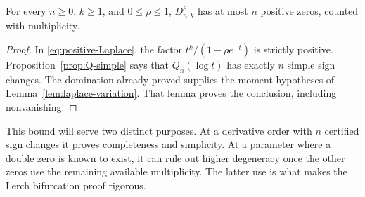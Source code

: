\begin{theorem}
\label{thm:global-zero-bound}
For every $n\ge0$, $k\ge1$, and $0\le\rho\le1$,
$D_{n,k}^{\rho}$ has at most $n$ positive zeros, counted with multiplicity.
\end{theorem}
\begin{proof}
In \eqref{eq:positive-Laplace}, the factor $t^k/(1-\rho e^{-t})$ is
strictly positive. Proposition~\ref{prop:Q-simple} says that
$Q_n(\log t)$ has exactly $n$ simple sign changes. The domination already
proved supplies the moment hypotheses of Lemma~\ref{lem:laplace-variation}.
That lemma proves the conclusion, including nonvanishing.
\end{proof}

This bound will serve two distinct purposes. At a derivative order with
$n$ certified sign changes it proves completeness and simplicity. At a
parameter where a double zero is known to exist, it can rule out higher
degeneracy once the other zeros use the remaining available multiplicity.
The latter use is what makes the Lerch bifurcation proof rigorous.
